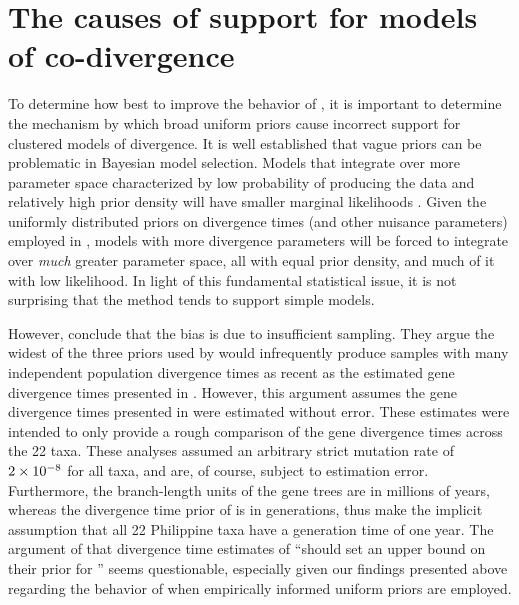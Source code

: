 \section{The causes of support for models of co-divergence}
To determine how best to improve the behavior of \msb, it is important to
determine the mechanism by which broad uniform priors cause incorrect support
for clustered models of divergence.
It is well established that vague priors can be problematic in Bayesian model
selection.
Models that integrate over more parameter space characterized by low
probability of producing the data and relatively high prior density will have
smaller marginal likelihoods \citep{Jeffreys1939,Lindley1957}.
Given the uniformly distributed priors on divergence times (and other nuisance
parameters) employed in \msb, models with more divergence parameters will be
forced to integrate over \emph{much} greater parameter space, all with equal
prior density, and much of it with low likelihood.
In light of this fundamental statistical issue, it is not surprising that the
method tends to support simple models.

However, \citet{Hickerson2013} conclude that the bias is due to insufficient
sampling.
They argue the widest of the three priors used by \citet{Oaks2012} would
infrequently produce samples with many independent population divergence times
as recent as the estimated gene divergence times presented in \citet{Oaks2012}.
However, this argument assumes the gene divergence times presented in
\citet{Oaks2012} were estimated without error.
These estimates were intended to only provide a rough comparison of the
gene divergence times across the 22 taxa.
These analyses assumed an arbitrary strict mutation rate of $2\times 10^{-8}$ for all
taxa, and are, of course, subject to estimation error.
Furthermore, the branch-length units of the gene trees are in millions of
years, whereas the divergence time prior of \msb is in generations, thus
\citet{Hickerson2013} make the implicit assumption that all 22 Philippine taxa
have a generation time of one year.
The argument of \citet{Hickerson2013} that divergence time estimates of
\citet{Oaks2012} ``should set an upper bound on their prior for \divt{}'' seems
questionable, especially given our findings presented above regarding the
behavior of \msb when empirically informed uniform priors are employed.

